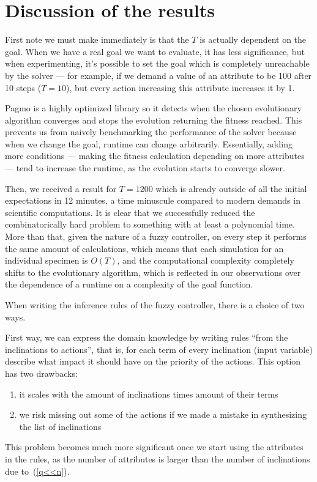 \documentclass[12pt, a4paper]{report}
\begin{document}
	
	\section{Discussion of the results}

	First note we must make immediately is that the $T$ is actually dependent on the goal.
	When we have a real goal we want to evaluate, it has less significance, but when experimenting, it's possible to set the goal which is completely unreachable by the solver --- for example, if we demand a value of an attribute to be 100 after 10 steps ($T = 10$), but every action increasing this attribute increases it by 1.

	Pagmo is a highly optimized library so it detects when the chosen evolutionary algorithm converges and stops the evolution returning the fitness reached.
	This prevents us from naively benchmarking the performance of the solver because when we change the goal, runtime can change arbitrarily.
	Essentially, adding more conditions --- making the fitness calculation depending on more attributes --- tend to increase the runtime, as the evolution starts to converge slower.

	Then, we received a result for $T = 1200$ which is already outside of all the initial expectations in 12 minutes, a time minuscule compared to modern demands in scientific computations.
	It is clear that we successfully reduced the combinatorically hard problem to something with at least a polynomial time.
	More than that, given the nature of a fuzzy controller, on every step it performs the same amount of calculations, which means that each simulation for an individual specimen is $O(T)$, and the computational complexity completely shifts to the evolutionary algorithm, which is reflected in our observations over the dependence of a runtime on a complexity of the goal function.

	When writing the inference rules of the fuzzy controller, there is a choice of two ways.
	
	First way, we can express the domain knowledge by writing rules ``from the inclinations to actions'', that is, for each term of every inclination (input variable) describe what impact it should have on the priority of the actions.
	This option has two drawbacks:
	\begin{enumerate}
		\item it scales with the amount of inclinations times amount of their terms
		\item we risk missing out some of the actions if we made a mistake in synthesizing the list of inclinations
	\end{enumerate}
	This problem becomes much more significant once we start using the attributes in the rules, as the number of attributes is larger than the number of inclinations due to~(\ref{q<<n}).
	
\end{document}
